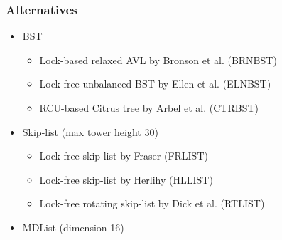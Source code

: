 \documentclass{beamer}
\begin{document}
\begin{frame} \frametitle{Alternatives}
    \begin{itemize}
        \item BST
            \begin{itemize}
                \item Lock-based relaxed AVL by Bronson et al. (BRNBST)
                \item Lock-free unbalanced BST by Ellen et al. (ELNBST)
                \item RCU-based Citrus tree by Arbel et al. (CTRBST)
            \end{itemize}
        \item Skip-list (max tower height 30)
            \begin{itemize}
                \item Lock-free skip-list by Fraser (FRLIST)
                \item Lock-free skip-list by Herlihy (HLLIST)
                \item Lock-free rotating skip-list by Dick et al. (RTLIST)
            \end{itemize}
        \item MDList (dimension 16)
    \end{itemize}
\end{frame}
\end{document}

